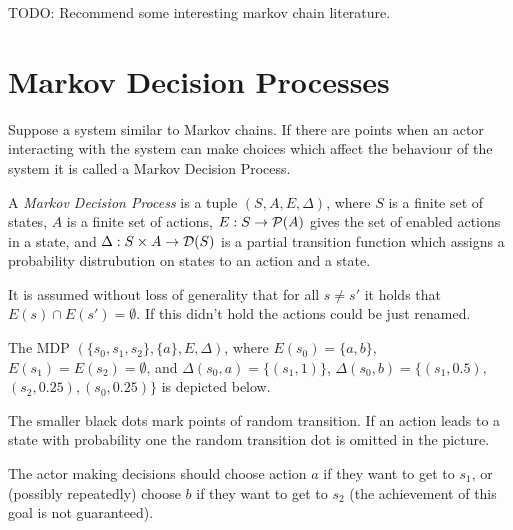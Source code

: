 TODO: Recommend some interesting markov chain literature.

\section{Markov Decision Processes}

Suppose a system similar to Markov chains.
If there are points when an actor interacting with the system can make
choices which affect the behaviour of the system it is called a Markov
Decision Process.

\begin{definition}
A {\em Markov Decision Process} is a tuple $(S, A, E, \Delta)$, where
$S$ is a finite set of states,
$A$ is a finite set of actions,
$E : S \to \mathcal{P}(A)$ gives the set of enabled actions in a state,
and $\Delta : S \times A \to \mathcal{D}(S)$ is a partial transition
function which assigns a probability distrubution on states to an action
and a state.

It is assumed without loss of generality that for all $s \neq s'$ it
holds that $E(s) \cap E(s') = \emptyset$. If this didn't hold the
actions could be just renamed.
\end{definition}

\begin{example} The MDP $(\{s_0, s_1, s_2\}, \{a\}, E, \Delta)$,
    where
    $E(s_0) = \{a,b\}$, $E(s_1) = E(s_2) = \emptyset$,
    and $\Delta(s_0, a) = \{(s_1, 1)\}$,
    $\Delta(s_0, b) = \{(s_1, 0.5),$ $(s_2,0.25), (s_0,0.25)\}$
    is depicted below.

    The smaller black dots mark points of random transition. If an
    action leads to a state with probability one the random transition
    dot is omitted in the picture.

    The actor making decisions should choose action $a$ if
    they want to get to $s_1$, or (possibly repeatedly) choose $b$ if
    they want to get to $s_2$ (the achievement of this goal is not
    guaranteed).

\hfill \break
\centering
{}

\end{example}

